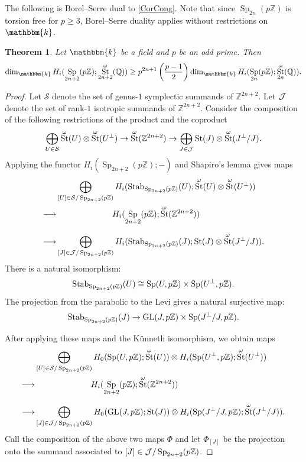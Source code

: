 \documentclass[11pt,letterpaper]{amsart}
\newcommand{\bk}{\mathbbm{k}}
\DeclareMathOperator{\Sp}{Sp}
\newcommand{\cS}{\mathcal{S}}\newcommand{\cT}{\mathcal{T}}
\newcommand{\Z}{\mathbb{Z}}
\newcommand{\Q}{\mathbb{Q}}
\numberwithin{theoremcounter}{section}
\newtheorem{theorem}[theoremauto]{Theorem}
\theoremstyle{definition}
\theoremstyle{remark}
\newcommand{\mr}[1]{{\rm #1}}
\newcommand{\Stab}{\mr{Stab}}
\DeclareMathOperator{\GL}{GL}
\DeclareMathOperator{\St}{St}
\begin{document}
The following is Borel--Serre dual to \autoref{CorCong}. Note that since $\Sp_{2n}(p\Z)$ is torsion free for $p \geq 3$,  Borel--Serre duality applies without restrictions on $\bk$.

\begin{theorem}
    Let $\bk$ be a field and $p$ be an odd prime. Then 
$$\dim_\bk H_i(\Sp_{2n+2}(p\Z);\St_{2n+2}^\omega(\Q)) \geq  p^{2n+1} \left(\frac{p-1}{2}\right) \dim_\bk H_i(\Sp_{2n}(p\Z);\St_{2n}^\omega(\Q)).$$ 
\end{theorem}

\begin{proof}

Let $\cS$ denote the set of genus-$1$ symplectic summands of $\Z^{2n+2}$. Let $\mathcal{J}$ denote the set of rank-$1$ isotropic summands of $\Z^{2n+2}$. Consider the composition of the following restrictions of the product and the coproduct 
$$\bigoplus_{U \in \cS} \St^\omega(U) \otimes \St^\omega(U^\perp) \to \St^\omega(\Z^{2n+2}) \to \bigoplus_{J \in \cJ} \St(J) \otimes \St^\omega(J^\perp/J). $$ 
Applying the functor $H_i(\Sp_{2n+2}(p\Z) ; - )$ and Shapiro's lemma gives maps 
\begin{align*}
&\bigoplus_{[U] \in \cS/\Sp_{2n+2}(p\Z)} H_i(\Stab_{\Sp_{2n+2}(p\Z)}(U) ; \St^\omega(U) \otimes  \St^\omega(U^\perp)) \\
\longrightarrow &\phantom{\bigoplus_{[U] \in \cS/\Sp_{2n+2}(p\Z)}}H_i(\Sp_{2n+2}(p\Z); \St^\omega(\Z^{2n+2})) \\
\longrightarrow&\bigoplus_{[J] \in \cJ/\Sp_{2n+2}(p\Z)} H_i(\Stab_{\Sp_{2n+2}(p\Z)}(J) ; \St(J) \otimes \St^\omega(J^\perp/J)).
\end{align*}
There is a natural isomorphism:
$$\Stab_{\Sp_{2n+2}(p\Z)}(U) \cong \Sp(U,p\Z) \times \Sp(U^\perp,p\Z).$$ The projection from the parabolic to the Levi gives a natural surjective map: $$ \Stab_{\Sp_{2n+2}(p\Z)}(J) \to \GL(J,p\Z) \times \Sp(J^\perp/J,p\Z). $$

After applying these maps and the Künneth isomorphism, we obtain maps 
\begin{align*}
&\bigoplus_{[U] \in \cS/\Sp_{2n+2}(p\Z)} H_0(\Sp( U,p\Z) ; \St^\omega(U)) \otimes H_i(\Sp( U^\perp,p\Z ); \St^\omega(U^\perp))\\
\longrightarrow&\phantom{\bigoplus_{[U] \in \cS/\Sp_{2n+2}(p\Z)} }H_i(\Sp_{2n+2}(p\Z);\St^\omega(\Z^{2n+2}))  \\
\longrightarrow &\bigoplus_{[J] \in \cJ/\Sp_{2n+2}(p\Z)} H_0(\GL(J,p\Z) ; \St(J)) \otimes H_i(\Sp(J^\perp/J,p\Z); \St^\omega(J^\perp/J)). 
\end{align*}
Call the composition of the above two maps $\Phi$ and let $\Phi_{[J]}$ be the projection onto the summand associated to $[J] \in \cJ/\Sp_{2n+2}(p\Z)$. 


\end{proof}
\end{document}

